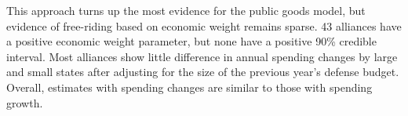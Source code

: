 \documentclass[12pt]{article}
\begin{document}
This approach turns up the most evidence for the public goods model, but evidence of free-riding based on economic weight remains sparse. 
43 alliances have a positive economic weight parameter, but none have a positive 90\% credible interval. 
Most alliances show little difference in annual spending changes by large and small states after adjusting for the size of the previous year's defense budget. 
Overall, estimates with spending changes are similar to those with spending growth. 


\newpage
\singlespace


 
\end{document}
